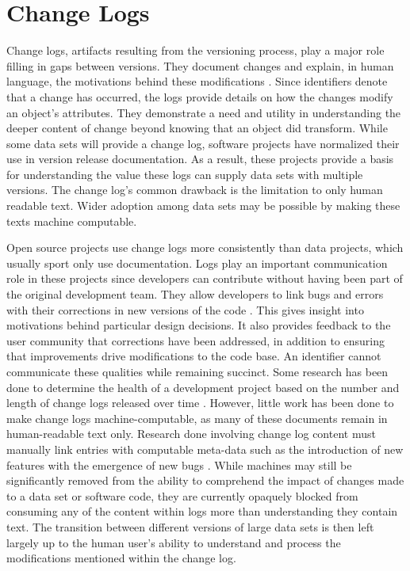\section{Change Logs} \label{sec:changelog}

Change logs, artifacts resulting from the versioning process, play a major role filling in gaps between versions.
They document changes and explain, in human language, the motivations behind these modifications \cite{uel1037}.
Since identifiers denote that a change has occurred, the logs provide details on how the changes modify an object's attributes.
They demonstrate a need and utility in understanding the deeper content of change beyond knowing that an object did transform.
While some data sets will provide a change log, software projects have normalized their use in version release documentation.
As a result, these projects provide a basis for understanding the value these logs can supply data sets with multiple versions.
The change log's common drawback is the limitation to only human readable text.
Wider adoption among data sets may be possible by making these texts machine computable.

Open source projects use change logs more consistently than data projects, which usually sport only use documentation.
Logs play an important communication role in these projects since developers can contribute without having been part of the original development team.
They allow developers to link bugs and errors with their corrections in new versions of the code \cite{Chen:2004:OCL:990374.990391}.
This gives insight into motivations behind particular design decisions.
It also provides feedback to the user community that corrections have been addressed, in addition to ensuring that improvements drive modifications to the code base.
An identifier cannot communicate these qualities while remaining succinct.
Some research has been done to determine the health of a development project based on the number and length of change logs released over time \cite{German03automatingthe}.
However, little work has been done to make change logs machine-computable, as many of these documents remain in human-readable text only.
Research done involving change log content must manually link entries with computable meta-data such as the introduction of new features with the emergence of new bugs \cite{6132954}.
While machines may still be significantly removed from the ability to comprehend the impact of changes made to a data set or software code, they are currently opaquely blocked from consuming any of the content within logs more than understanding they contain text.
The transition between different versions of large data sets is then left largely up to the human user's ability to understand and process the modifications mentioned within the change log.

